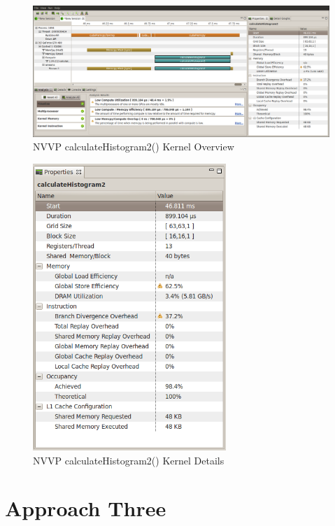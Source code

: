 \documentclass{article}
\begin{document}
\begin{figure}
\centering
\includegraphics[width=1.0\textwidth]{screenshots/nvvp/calculateHistogram2_screen1.png}
\caption{NVVP calculateHistogram2() Kernel Overview}
\label{kernel2nvvp1}
\end{figure}

\begin{figure}
\centering
\includegraphics[width=0.65\textwidth]{screenshots/nvvp/calculateHistogram2_screen3.png}
\caption{NVVP calculateHistogram2() Kernel Details}
\label{kernel2nvvp3}
\end{figure}

\section{Approach Three}\label{approach3}
\end{document}
